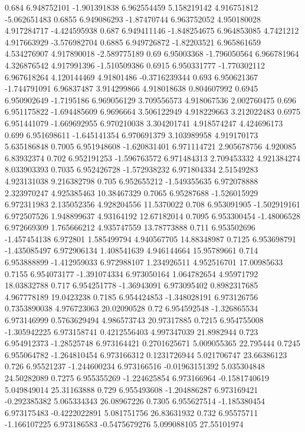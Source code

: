 {0.684 6.948752101 -1.901391838 6.962554459 5.158219142 4.916751812 -5.062651483
0.6855 6.949086293 -1.87470744 6.963752052 4.950180028 4.917284717 -4.424595938
0.687 6.949411146 -1.848254675 6.964853085 4.7421212 4.917663929 -3.576982704
0.6885 6.949726872 -1.82203521 6.965861659 4.534276907 4.917890018 -2.589775189
0.69 6.95003368 -1.796050564 6.966781964 4.326876542 4.917991396 -1.510509386
0.6915 6.950331777 -1.770302112 6.967618264 4.120144469 4.91801486 -0.3716239344
0.693 6.950621367 -1.744791091 6.96837487 3.914299866 4.918018638 0.804607992
0.6945 6.950902649 -1.7195186 6.969056129 3.709556573 4.918067536 2.002760475
0.696 6.951175822 -1.694485609 6.9696664 3.506122949 4.918229663 3.212022483
0.6975 6.951441079 -1.669692955 6.970210038 3.304201741 4.918574247 4.424696173
0.699 6.951698611 -1.645141354 6.970691379 3.103989958 4.919170173 5.635186848
0.7005 6.951948608 -1.620831401 6.971114721 2.905678756 4.920085 6.83932374
0.702 6.952191253 -1.596763572 6.971484313 2.709453332 4.921384274 8.033903393
0.7035 6.952426728 -1.572938232 6.971804334 2.51549283 4.923131038 9.216382798
0.705 6.952655212 -1.549355635 6.972078888 2.323970247 4.925385463 10.38467329
0.7065 6.95287688 -1.526015929 6.972311983 2.135052356 4.928204556 11.5370022
0.708 6.953091905 -1.502919161 6.972507526 1.948899637 4.93164192 12.67182014
0.7095 6.953300454 -1.48006528 6.972669309 1.765666212 4.935747559 13.78773888
0.711 6.953502696 -1.457454138 6.972801 1.585499794 4.940567705 14.88348987
0.7125 6.953698791 -1.435085497 6.972906134 1.408541639 4.946144664 15.95789661
0.714 6.953888899 -1.412959033 6.972988107 1.234926511 4.952516701 17.00985633
0.7155 6.954073177 -1.391074334 6.973050164 1.064782654 4.95971792 18.03832788
0.717 6.954251778 -1.36943091 6.973095402 0.8982317685 4.967778189 19.0423238
0.7185 6.954424853 -1.348028191 6.973126756 0.7353890038 4.976723063 20.02090528
0.72 6.954592548 -1.326865534 6.973146999 0.5763629494 4.986573743 20.97317885
0.7215 6.954755008 -1.305942225 6.973158741 0.4212556403 4.997347039 21.8982944
0.723 6.954912373 -1.28525748 6.973164421 0.2701625671 5.009055365 22.795444
0.7245 6.955064782 -1.264810454 6.973166312 0.1231726944 5.021706747 23.66386123
0.726 6.95521237 -1.244600234 6.973166516 -0.01963151392 5.035304848 24.50282089
0.7275 6.955355269 -1.224625854 6.973166964 -0.1581740619 5.049849014 25.31163888
0.729 6.955493608 -1.204886287 6.973169421 -0.292385382 5.065334343 26.08967226
0.7305 6.955627514 -1.185380454 6.973175483 -0.4222022891 5.081751756 26.83631932
0.732 6.95575711 -1.166107225 6.973186583 -0.5475679276 5.099088105 27.55101974
}
